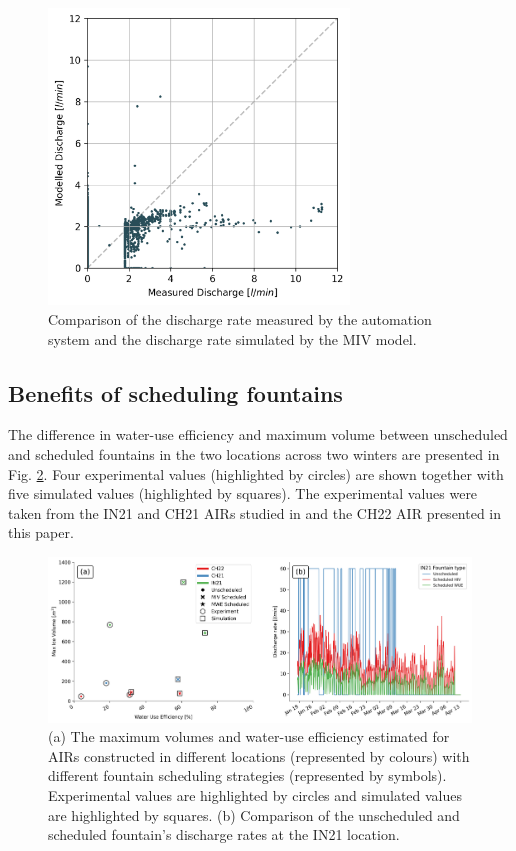 \documentclass[tc, manuscript]{copernicus}
\begin{document}
\begin{figure}[t]
\includegraphics[width=8cm]{Figures/simvsreal2.png}

\caption{ Comparison of the discharge rate measured by the automation system and the discharge rate simulated by the MIV
model. }

\label{fig:simvsreal}
\end{figure}

\subsection{Benefits of scheduling fountains}

The difference in water-use efficiency and maximum volume between unscheduled and scheduled fountains in the two
locations across two winters are presented in Fig. \ref{fig:wue}. Four experimental values (highlighted by
circles) are shown together with five simulated values (highlighted by squares).  The experimental values were
taken from the IN21 and CH21 AIRs studied in \citet{balasubramanianInfluenceMeteorologicalConditions2022} and
the CH22 AIR presented in this paper. 

\begin{figure}[t]
\includegraphics[width=\textwidth]{Figures/wue.png}

\caption{(a) The maximum volumes and water-use efficiency estimated for AIRs constructed in different locations
(represented by colours) with different fountain scheduling strategies (represented by symbols). Experimental
values are highlighted by circles and simulated values are highlighted by squares. (b) Comparison of
the unscheduled and scheduled fountain's discharge rates at the IN21 location.}

\label{fig:wue}
\end{figure}
\end{document}
